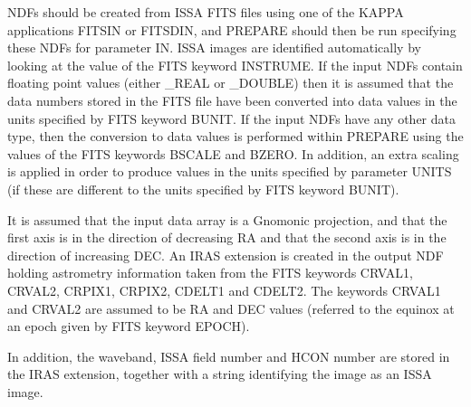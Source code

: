 \documentclass[11pt,nolof,noabs]{starlink}
\begin{document}
\begin{small}
{{   }{
      NDFs should be created from ISSA FITS files using one of the
      KAPPA applications FITSIN or FITSDIN, and PREPARE should then be
      run specifying these NDFs for parameter IN. ISSA images are
      identified automatically by looking at the value of the FITS
      keyword INSTRUME. If the input NDFs contain floating point values
      (either \_REAL or \_DOUBLE) then it is assumed that the data
      numbers stored in the FITS file have been converted into data
      values in the units specified by FITS keyword BUNIT. If the input
      NDFs have any other data type, then the conversion to data values
      is performed within PREPARE using the values of the FITS keywords
      BSCALE and BZERO.  In addition, an extra scaling is applied in
      order to produce values in the units specified by parameter UNITS
      (if these are different to the units specified by FITS keyword
      BUNIT).

      It is assumed that the input data array is a Gnomonic projection,
      and that the first axis is in the direction of decreasing RA and
      that the second axis is in the direction of increasing DEC. An
      IRAS extension is created in the output NDF holding astrometry
      information taken from the FITS keywords CRVAL1, CRVAL2, CRPIX1,
      CRPIX2, CDELT1 and CDELT2. The keywords CRVAL1 and CRVAL2 are
      assumed to be RA and DEC values (referred to the equinox at an
      epoch given by FITS keyword EPOCH).

      In addition, the waveband, ISSA field number and HCON number are
      stored in the IRAS extension, together with a string identifying
      the image as an ISSA image.
   }
   }
\end{small}
\end{document}
